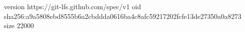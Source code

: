version https://git-lfs.github.com/spec/v1
oid sha256:a9a5808ebd8555b6a2cbddda0616ba4c8afc59217202fcfe13de27350a0a8273
size 22000
